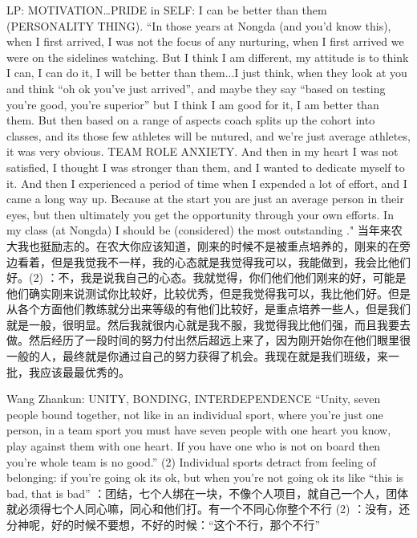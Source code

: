 \begin{CJK}{UTF8}{gbsn}
        LP:
        MOTIVATION…PRIDE in SELF: I can be better than them (PERSONALITY THING). “In those years at Nongda (and you’d know this), when I first arrived, I was not the focus of any nurturing, when I first arrived we were on the sidelines watching.  But I think I am different, my attitude is to think I can, I can do it, I will be better than them...I just think, when they look at you and think “oh ok you’ve just arrived”, and maybe they say “based on testing you’re good, you’re superior” but I think I am good for it, I am better than them.  But then based on a range of aspects coach splits up the cohort into classes, and its those few athletes will be nutured, and we’re just average athletes, it was very obvious. TEAM ROLE ANXIETY. And then in my heart I was not satisfied, I thought I was stronger than them, and I wanted to dedicate myself to it.  And then I experienced a period of time when I expended a lot of effort, and I came a long way up.  Because at the start you are just an average person in their eyes, but then ultimately you get the opportunity through your own efforts. In my class (at Nongda) I should be (considered) the most outstanding ."	当年来农大我也挺励志的。在农大你应该知道，刚来的时候不是被重点培养的，刚来的在旁边看着，但是我觉我不一样，我的心态就是我觉得我可以，我能做到，我会比他们好。(2) ：不，我是说我自己的心态。我就觉得，你们他们他们刚来的好，可能是他们确实刚来说测试你比较好，比较优秀，但是我觉得我可以，我比他们好。但是从各个方面他们教练就分出来等级的有他们比较好，是重点培养一些人，但是我们就是一般，很明显。然后我就很内心就是我不服，我觉得我比他们强，而且我要去做。然后经历了一段时间的努力付出然后超远上来了，因为刚开始你在他们眼里很一般的人，最终就是你通过自己的努力获得了机会。我现在就是我们班级，来一批，我应该最最优秀的。













        Wang Zhankun:
        UNITY, BONDING, INTERDEPENDENCE
        “Unity, seven people bound together, not like in an individual sport, where you’re just one person, in a team sport you must have seven people with one heart you know, play against them with one heart.  If you have one who is not on board then you’re whole team is no good.” (2) Individual sports detract from feeling of belonging: if you’re going ok its ok, but when you’re not going ok its like “this is bad, that is bad”	：团结，七个人绑在一块，不像个人项目，就自己一个人，团体就必须得七个人同心嘛，同心和他们打。有一个不同心你整个不行 (2) ：没有，还分神呢，好的时候不要想，不好的时候：“这个不行，那个不行”



\end{CJK}
